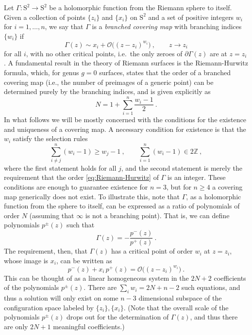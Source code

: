 \documentclass[a4paper,11pt]{article}
\numberwithin{equation}{section}
\begin{document}
Let $\Gamma:\text{S}^2\to\text{S}^2$ be a holomorphic function from the Riemann sphere to itself. Given a collection of points $\{z_i\}$ and $\{x_i\}$ on $\text{S}^2$ and a set of positive integers $w_i$ for $i=1,\ldots,n$, we say that $\Gamma$ is a \textit{branched covering map} with branching indices $\{w_i\}$ if
\begin{equation}
\Gamma(z)\sim x_i+\mathcal{O}\bigl((z-z_i)^{w_i}\bigr)\ ,\qquad z\to z_i 
\end{equation}
for all $i$, with no other critical points, i.e.\ the only zeroes of $\partial\Gamma(z)$ are at $z=z_i$. A fundamental result in the theory of Riemann surfaces is the Riemann-Hurwitz formula, which, for genus $g=0$ surfaces, states that the order of a branched covering map (i.e., the number of preimages of a generic point) can be determined purely by the branching indices, and is given explicitly as
\begin{equation}
N=1+\sum_{i=1}^{n}\frac{w_i-1}{2}\ .
\label{eq:Riemann-Hurwitz}
\end{equation}
In what follows we will be mostly concerned with the conditions for the existence and uniqueness of a covering map. A necessary condition for existence is that the $w_i$ satisfy the selection rules
\begin{equation}
\sum_{i\neq j}^{n}(w_i-1)\geq w_j-1\ ,\qquad \sum_{i=1}^{n}(w_i-1)\in 2\mathbb{Z}\ ,
\label{eq:selection-rules}
\end{equation}
where the first statement holds for all $j$, and the second statement is merely the requirement that the order \eqref{eq:Riemann-Hurwitz} of $\Gamma$ is an integer. These conditions are enough to guarantee existence for $n=3$, but for $n\geq 4$ a covering map generically does not exist. To illustrate this, note that $\Gamma$, as a holomorphic function from the sphere to itself, can be expressed as a ratio of polynomials of order $N$ (assuming that $\infty$ is not a branching point). That is, we can define polynomials $p^{\pm}(z)$ such that
\begin{equation}
\Gamma(z)=-\frac{p^-(z)}{p^+(z)}\ .
\label{eq:gamma-def}
\end{equation}
The requirement, then, that $\Gamma(z)$ has a critical point of order $w_i$ at $z=z_i$, whose image is $x_i$, can be written as
\begin{equation}
p^-(z)+x_i\,p^+(z) = \mathcal{O}\bigl((z-z_i)^{w_i}\bigr)\ .
\label{eq:gamma-constraint}
\end{equation}
This can be thought of as a linear homogeneous system in the $2N+2$ coefficients of the polynomials $p^{\pm}(z)$. There are $\sum_{i}w_i=2N+n-2$ such equations, and thus a solution will only exist on some $n-3$ dimensional subspace of the configuration space labeled by $\{z_i\},\{x_i\}$. (Note that the overall scale of the polynomials $p^{\pm}(z)$ drops out for the determination of $\Gamma(z)$, and thus there are only $2N+1$ meaningful coefficients.)
\end{document}
